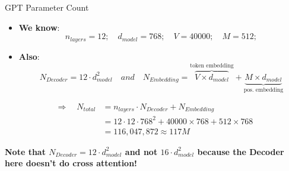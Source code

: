 \documentclass[11pt,compress,t,notes=noshow, xcolor=table]{beamer}
\begin{document}
\begin{frame}{GPT Parameter Count}

\vfill 

\begin{itemize}
	\item \textbf{We know}: 
		$$n_{layers} = 12; \quad d_{model} = 768; \quad V = 40000; \quad M = 512;$$
	\item \textbf{Also}: 
		$$N_{Decoder} = 12\cdot d_{model}^2 \quad and \quad  N_{Embedding} = \overbrace{V \times d_{model}}^{\text{token embedding}} + \underbrace{M \times d_{model}}_{\text{pos. embedding}}$$
	\end{itemize}

$$
\begin{aligned}
\Rightarrow \quad N_{total} &= n_{layers} \cdot N_{Decoder} + N_{Embedding} \\ 
&= 12\cdot 12\cdot 768^2 + 40000\times 768 + 512\times 768 \\
&= 116,047,872 \approx 117M
\end{aligned}
$$

\vfill
\textbf{Note that $N_{Decoder} = 12\cdot d_{model}^2$ and not $16 \cdot d_{model}^2$ because the Decoder here doesn't do cross attention!}
	
\end{frame}


\endlecture
\end{document}
